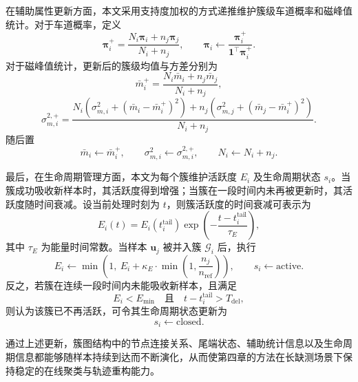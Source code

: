 \documentclass{xdupgthesis}
\begin{document}
在辅助属性更新方面，本文采用支持度加权的方式递推维护簇级车道概率和磁峰值统计。对于车道概率，定义
\begin{equation}
	\boldsymbol{\pi}_i^{+}
	=
	\frac{N_i\boldsymbol{\pi}_i+n_j\boldsymbol{\pi}_j}{N_i+n_j},
	\qquad
	\boldsymbol{\pi}_i
	\leftarrow
	\frac{\boldsymbol{\pi}_i^{+}}{\mathbf{1}^{\top}\boldsymbol{\pi}_i^{+}}.
\end{equation}
对于磁峰值统计，更新后的簇级均值与方差分别为
\begin{equation}
	\bar m_i^{+}
	=
	\frac{N_i\bar m_i+n_j\bar m_j}{N_i+n_j},
\end{equation}
\begin{equation}
	\sigma_{m,i}^{2,+}
	=
	\frac{
		N_i\left(\sigma_{m,i}^{2}+(\bar m_i-\bar m_i^{+})^2\right)
		+
		n_j\left(\sigma_{m,j}^{2}+(\bar m_j-\bar m_i^{+})^2\right)
	}{
		N_i+n_j
	}.
\end{equation}
随后置
\begin{equation}
	\bar m_i \leftarrow \bar m_i^{+}, \qquad
	\sigma_{m,i}^{2} \leftarrow \sigma_{m,i}^{2,+}, \qquad
	N_i \leftarrow N_i+n_j.
\end{equation}

最后，在生命周期管理方面，本文为每个簇维护活跃度 $E_i$ 及生命周期状态 $s_i$。当簇成功吸收新样本时，其活跃度得到增强；当簇在一段时间内未再被更新时，其活跃度随时间衰减。设当前处理时刻为 $t$，则簇活跃度的时间衰减可表示为
\begin{equation}
	E_i(t)=E_i(t_i^{\mathrm{tail}})\exp\!\left(-\frac{t-t_i^{\mathrm{tail}}}{\tau_E}\right),
\end{equation}
其中 $\tau_E$ 为能量时间常数。当样本 $\mathbf{u}_j$ 被并入簇 $\mathcal{G}_i$ 后，执行
\begin{equation}
	E_i \leftarrow \min\!\left(1,\ E_i+\kappa_E\cdot \min\!\left(1,\frac{n_j}{n_{\mathrm{ref}}}\right)\right),
	\qquad
	s_i \leftarrow \mathrm{active}.
\end{equation}
反之，若簇在连续一段时间内未能吸收新样本，且满足
\begin{equation}
	E_i < E_{\min}
	\quad \text{且} \quad
	t-t_i^{\mathrm{tail}} > T_{\mathrm{del}},
\end{equation}
则认为该簇已不再活跃，可令其生命周期状态更新为
\begin{equation}
	s_i \leftarrow \mathrm{closed}.
\end{equation}

通过上述更新，簇图结构中的节点连接关系、尾端状态、辅助统计信息以及生命周期信息都能够随样本持续到达而不断演化，从而使第四章的方法在长缺测场景下保持稳定的在线聚类与轨迹重构能力。
\end{document}
